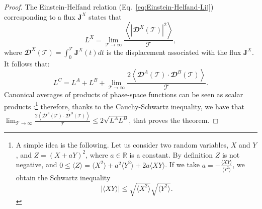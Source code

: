 \begin{proof}
The Einstein-Helfand relation (Eq.~\eqref{eq:Einstein-Helfand-Lij}) corresponding to a flux $\mathbf{J}^X$ states that 
\begin{equation}
    L^{X} = \lim_{\mathcal{T}\rightarrow\infty} \frac{\left\langle|\mathbfcal{D}^X(\mathcal{T})|^2\right\rangle} {\mathcal{T}},
\end{equation}
where $\mathbfcal{D}^X(\mathcal{T})=\int_0^{\mathcal{T}} \mathbf{J}^X(t) dt$ is the displacement associated with the flux $\mathbf{J}^X$. It follows that:
\begin{equation}
    L^{C} = L^{A} + L^{B} + \lim_{\mathcal{T}\rightarrow\infty} \frac{2\left\langle \mathbfcal{D}^A(\mathcal{T}) \cdot \mathbfcal{D}^B(\mathcal{T})\right\rangle}{\mathcal{T}}.
\end{equation}
Canonical averages of products of phase-space functions can be seen as scalar products \cite{Koopman1931,vNeumann1932}:\footnote{A simple idea is the following. Let us consider two random variables, $X$ and $Y$, and $Z=(X+aY)^2$, where $a\in \mathbb{R}$ is a constant. By definition $Z$ is not negative, and $0\leq \langle Z \rangle = \langle X^2 \rangle + a^2 \langle Y^2 \rangle + 2a \langle XY \rangle$. If we take $a = -\frac{\langle XY \rangle}{\langle Y^2 \rangle}$, we obtain the Schwartz inequality
\begin{equation} \label{eq:schwartz-ineq}
    |\langle XY \rangle| \leq \sqrt{\langle X^2 \rangle} \sqrt{\langle Y^2 \rangle}.
\end{equation}}
therefore, thanks to the Cauchy-Schwartz inequality, we have that $\lim_{\mathcal{T}\rightarrow\infty} \frac{2\left\langle \mathbfcal{D}^A(\mathcal{T}) \cdot \mathbfcal{D}^B(\mathcal{T})\right\rangle}{\mathcal{T}} \leq 2\sqrt{L^{A} L^{B}}$, that proves the theorem. 
\end{proof}

